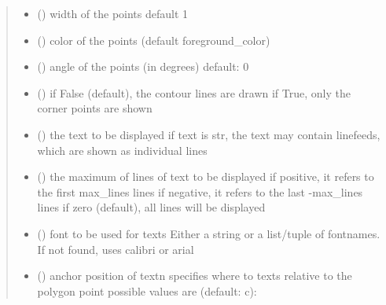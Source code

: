 \documentclass[letterpaper,10pt,english]{sphinxmanual}
\begin{document}
\begin{fulllineitems}
\begin{quote}
\begin{description}
\begin{itemize}
\item {} 
 () \textendash{} width of the points 
default 1

\item {} 
 () \textendash{} color of the points (default foreground\_color)

\item {} 
 () \textendash{} angle of the points (in degrees) 
default: 0

\item {} 
 () \textendash{} if False (default), the contour lines are drawn 
if True, only the corner points are shown

\item {} 
 (\sphinxstyleliteralemphasis{\sphinxupquote{, }}) \textendash{} the text to be displayed 
if text is str, the text may contain linefeeds, which are shown as individual lines

\item {} 
 () \textendash{} the maximum of lines of text to be displayed 
if positive, it refers to the first max\_lines lines 
if negative, it refers to the last -max\_lines lines 
if zero (default), all lines will be displayed

\item {} 
 () \textendash{} font to be used for texts 
Either a string or a list/tuple of fontnames.
If not found, uses calibri or arial

\item {} 
 () \textendash{} anchor position of text\textbar{}n\textbar{}
specifies where to texts relative to the polygon
point 
possible values are (default: c): 


\end{itemize}
\end{description}
\end{quote}
\end{fulllineitems}
\end{document}
